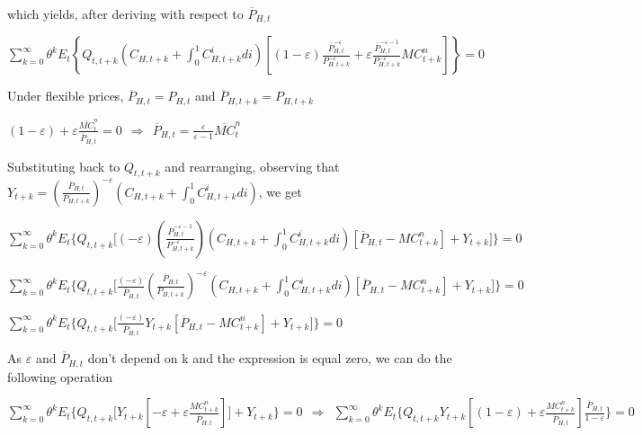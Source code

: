 \documentclass[
]{article}
\begin{document}
which yields, after deriving with respect to \(\overline{P}_{H,t}\)

\(\displaystyle \sum_{k=0}^\infty \theta^kE_t \left\{Q_{t,t+k} \left( C_{H,t+k}+\int_0^1C_{H,t+k}^i di\right) \left[(1-\varepsilon)\frac{\overline{P}_{H,t}^{-\varepsilon}}{P_{H,t+k}^{-\varepsilon}} +\varepsilon \frac{\overline{P}_{H,t}^{-\varepsilon-1}}{P_{H,t+k}^{-\varepsilon}} MC_{t+k}^n \right] \right\}=0\)

Under flexible prices, \(\overline P_{H,t}= P_{H,t}\) and
\(\overline P_{H,t+k}=P_{H, t+k}\)

\(\displaystyle (1-\varepsilon)+\varepsilon\frac{\overline{MC}_{t}^n}{\overline{P}_{H,t}}=0 \ \ \Rightarrow \ \ \overline{P}_{H,t} =\frac{\varepsilon}{\varepsilon-1} \overline{MC}_{t}^n\)

Substituting back to \(Q_{t, t+k}\) and rearranging, observing that
\(\displaystyle Y_{t+k} = \left( \frac{\overline{P}_{H,t}}{P_{H,t+k}} \right)^{-\varepsilon} \left( C_{H,t+k}+\int_0^1C_{H,t+k}^i di\right)\),
we get

\(\displaystyle \sum_{k=0}^\infty \theta^kE_t \Bigg\{ Q_{t,t+k} \Bigg[ (-\varepsilon) \left( \frac{\overline{P}_{H,t}^{-\varepsilon-1} }{P_{H,t+k}^{-\varepsilon} } \right)\left( C_{H,t+k}+\int_0^1 C_{H,t+k}^idi \right) \left[ \overline{P}_{H,t}-MC_{t+k}^n\right] + Y_{t+k} \Bigg]\Bigg\} = 0\)

\(\displaystyle \sum_{k=0}^\infty \theta^kE_t \Bigg\{ Q_{t,t+k} \Bigg[ \frac{(-\varepsilon)}{\overline{P}_{H,t}} \left( \frac{\overline{P}_{H,t}}{P_{H,t+k}} \right)^{-\varepsilon} \left( C_{H,t+k}+\int_0^1 C_{H,t+k}^idi \right) \left[ \overline{P}_{H,t}-MC_{t+k}^n\right] + Y_{t+k} \Bigg] \Bigg\} = 0\)

\(\displaystyle \sum_{k=0}^\infty \theta^kE_t \Bigg\{ Q_{t,t+k} \Bigg[ \frac{(-\varepsilon)}{\overline{P}_{H,t}} Y_{t+k } \left[ \overline{P}_{H,t}-MC_{t+k}^n\right] + Y_{t+k} \Bigg]\Bigg\} = 0\)

As \(\varepsilon\) and \(\overline{P}_{H,t}\) don't depend on k and the
expression is equal zero, we can do the following operation

\(\displaystyle \sum_{k=0}^\infty \theta^kE_t \Bigg\{ Q_{t,t+k} \Bigg[ Y_{t+k } \left[ -\varepsilon+\varepsilon \frac{MC_{t+k}^n}{\overline{P}_{H,t}} \right] \Bigg] + Y_{t+k} \Bigg\} = 0 \ \ \Rightarrow \ \ \sum_{k=0}^\infty \theta^kE_t \Bigg\{ Q_{t,t+k} Y_{t+k } \left[ (1-\varepsilon)+\varepsilon \frac{MC_{t+k}^n}{\overline{P}_{H,t}} \right] \frac{\overline{P}_{H,t}}{1-\varepsilon} \Bigg\} = 0\)
\end{document}

